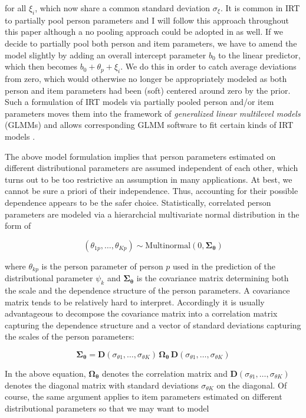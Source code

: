 \documentclass[jss]{jss}
\begin{document}
for all \(\xi_i\), which now share a common standard deviation
\(\sigma_\xi\). It is common in IRT to partially pool person parameters
\citep{deboeck2011} and I will follow this approach throughout this
paper although a no pooling approach could be adopted in  as
well. If we decide to partially pool both person and item parameters, we
have to amend the model slightly by adding an overall intercept
parameter \(b_0\) to the linear predictor, which then becomes
\(b_0 + \theta_p + \xi_i\). We do this in order to catch average
deviations from zero, which would otherwise no longer be appropriately
modeled as both person and item parameters had been (soft) centered
around zero by the prior. Such a formulation of IRT models via partially
pooled person and/or item parameters moves them into the framework of
\emph{generalized linear multilevel models} (GLMMs) and allows
corresponding GLMM software to fit certain kinds of IRT models
\citep{deboeck2011}.

The above model formulation implies that person parameters estimated on
different distributional parameters are assumed independent of each
other, which turns out to be too restrictive an assumption in many
applications. At best, we cannot be sure a priori of their independence.
Thus, accounting for their possible dependence appears to be the safer
choice. Statistically, correlated person parameters are modeled via a
hierarchcial multivariate normal distribution in the form of

\[
(\theta_{1p}, \ldots, \theta_{Kp}) \sim \text{Multinormal}(0, \mathbf{\Sigma_\theta})
\]

where \(\theta_{kp}\) is the person parameter of person \(p\) used in
the prediction of the distributional parameter \(\psi_k\) and
\(\mathbf{\Sigma_\theta}\) is the covariance matrix determining both the
scale and the dependence structure of the person parameters. A
covariance matrix tends to be relatively hard to interpret. Accordingly
it is usually advantageous to decompose the covariance matrix into a
correlation matrix capturing the dependence structure and a vector of
standard deviations capturing the scales of the person parameters:

\[
\mathbf{\Sigma_\theta} = \mathbf{D}(\sigma_{\theta 1}, \ldots, \sigma_{\theta K}) \, \mathbf{\Omega_\theta} \, \mathbf{D}(\sigma_{\theta 1}, \ldots, \sigma_{\theta K})
\]

In the above equation, \(\mathbf{\Omega_\theta}\) denotes the
correlation matrix and
\(\mathbf{D}(\sigma_{\theta 1}, \ldots, \sigma_{\theta K})\) denotes the
diagonal matrix with standard deviations \(\sigma_{\theta K}\) on the
diagonal. Of course, the same argument applies to item parameters
estimated on different distributional parameters so that we may want to
model
\end{document}
